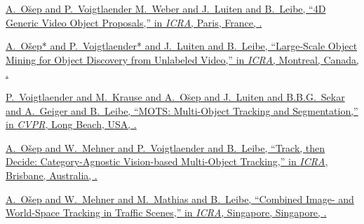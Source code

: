 \documentclass[letterpaper,MMMyyyy,nonstopmode]{simpleresumecv}
\begin{document}
\begin{Body}
\Gap
\href{https://arxiv.org/pdf/1901.09260.pdf}
{\underline{A.~O\u{s}ep} and P.~Voigtlaender M.~Weber and J.~Luiten and B.~Leibe,
``4D Generic Video Object Proposals,''
in \textit{ICRA},
Paris, France,
.}




\Gap
\href{https://arxiv.org/abs/1712.08832}
{\underline{A.~O\v{s}ep}* and P.~Voigtlaender* and J.~Luiten and B.~Leibe,
``Large-Scale Object Mining for Object Discovery from Unlabeled Video,''
in \textit{ICRA},
Montreal, Canada,
.}


\Gap
\href{https://arxiv.org/abs/1902.03604}
{P.~Voigtlaender and M.~Krause and \underline{A.~O\u{s}ep} and J.~Luiten and B.B.G.~Sekar and A.~Geiger and B.~Leibe,
``MOTS: Multi-Object Tracking and Segmentation,''
in \textit{CVPR},
Long Beach, USA,
.}

\Gap
\href{https://arxiv.org/pdf/1712.07920.pdf}
{\underline{A.~Ošep} and W.~Mehner and P.~Voigtlaender and B.~Leibe,
``Track, then Decide: Category-Agnostic Vision-based Multi-Object Tracking,''
in \textit{ICRA},
Brisbane, Australia,
.}

\Gap
\href{https://www.vision.rwth-aachen.de/media/papers/paper_final_compressed.pdf}
{\underline{A.~Ošep} and W.~Mehner and M.~Mathias and B.~Leibe,
``Combined Image- and World-Space Tracking in Traffic Scenes,''
in \textit{ICRA},
Singapore, Singapore,
.}



\end{Body}
\end{document}
